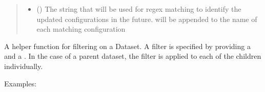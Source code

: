 \documentclass[letterpaper,10pt,english]{sphinxmanual}
\begin{document}
\begin{fulllineitems}
\begin{fulllineitems}
\begin{quote}
\begin{description}
\begin{itemize}
\item {} 
\sphinxAtStartPar
{} () \textendash{} The string that will be used for regex matching to identify
the updated configurations in the future.  will be
appended to the name of each matching configuration

\end{itemize}

\end{description}\end{quote}

\end{fulllineitems}


\begin{fulllineitems}
\label{\detokenize{dataset:colabfit.tools.dataset.Dataset.filter}}
\sphinxAtStartPar
A helper function for filtering on a Dataset. A filter is specified by
providing  a  and a . In the case of a parent
dataset, the filter is applied to each of the children individually.

\sphinxAtStartPar
Examples:

\begin{sphinxVerbatim}[commandchars=\\\{\}]
  

  
      \PYG{p}{[}\PYG{p}{]}

   


\end{sphinxVerbatim}
\end{fulllineitems}
\end{fulllineitems}
\end{document}
